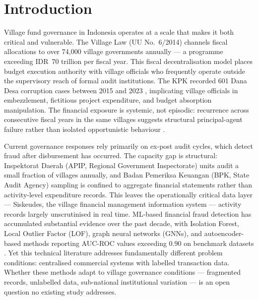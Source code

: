 \documentclass[3p,times,procedia]{elsarticle}
\begin{document}
\vspace*{-6pt}

\section{Introduction}
\label{sec:intro}

Village fund governance in Indonesia operates at a scale that makes it both critical and
vulnerable. The Village Law (UU No.~6/2014) channels fiscal allocations to over 74,000
village governments annually --- a programme exceeding IDR~70 trillion per fiscal year.
This fiscal decentralisation model places budget execution authority with village officials
who frequently operate outside the supervisory reach of formal audit institutions. The KPK
recorded 601 Dana Desa corruption cases between 2015 and 2023 \cite{method_kpk2023},
implicating village officials in embezzlement, fictitious project expenditure, and budget
absorption manipulation. The financial exposure is systemic, not episodic: recurrence
across consecutive fiscal years in the same villages suggests structural principal-agent
failure rather than isolated opportunistic behaviour \cite{method_jensen1976}.

Current governance responses rely primarily on ex-post audit cycles, which detect fraud
after disbursement has occurred. The capacity gap is structural: Inspektorat Daerah
(APIP, Regional Government Inspectorate) units audit a small fraction of villages
annually, and Badan Pemeriksa Keuangan (BPK, State Audit Agency) sampling is confined
to aggregate financial statements rather than activity-level expenditure records. This
leaves the operationally critical data layer --- Siskeudes, the village financial
management information system --- activity records largely unscrutinised in real time. ML-based financial fraud detection has accumulated
substantial evidence over the past decade, with Isolation Forest, Local Outlier Factor
(LOF), graph neural networks (GNNs), and autoencoder-based methods reporting AUC-ROC
values exceeding 0.90 on benchmark datasets \cite{p003,p007,p015,p022,p026,p041,p043}.
Yet this technical literature addresses fundamentally different problem conditions:
centralised commercial systems with labelled transaction data. Whether these methods adapt
to village governance conditions --- fragmented records, unlabelled data, sub-national
institutional variation --- is an open question no existing study addresses.
\end{document}
